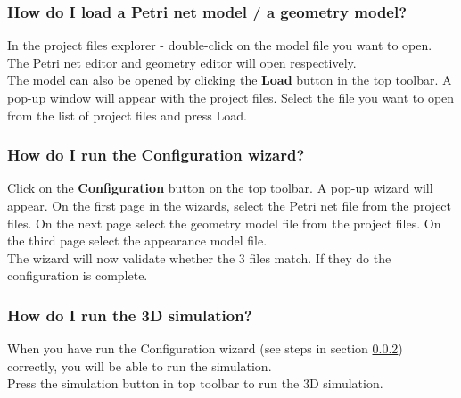 \subsubsection{How do I load a Petri net model / a geometry model?}
In the project files explorer - double-click on the model file you want to open. \\
The Petri net editor and geometry editor will open respectively. \\
\newline
The model can also be opened by clicking the \textbf{Load} button in the top toolbar.
A pop-up window will appear with the project files. Select the file you want to open from the list of project files and press Load. 

\subsubsection{How do I run the Configuration wizard?} \label{sec:conf_wizard}
Click on the \textbf{Configuration} button on the top toolbar. 
A pop-up wizard will appear. On the first page in the wizards, select the Petri net file from the project files. On the next page select the geometry model file from the project files. On the third page select the appearance model file. \\
The wizard will now validate whether the 3 files match. If they do the configuration is complete. 

\subsubsection{How do I run the 3D simulation?}
When you have run the Configuration wizard (see steps in section \ref{sec:conf_wizard}) correctly, you will be able to run the simulation. \\
Press the simulation button in top toolbar to run the 3D simulation. 
